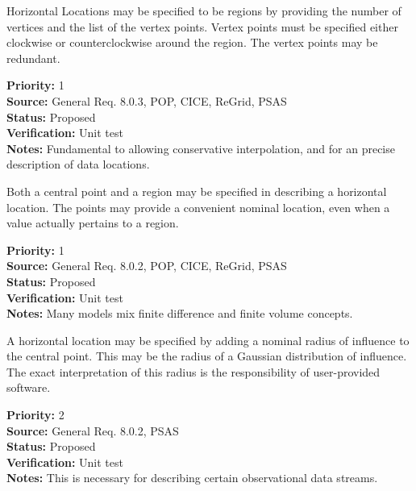 
  Horizontal Locations may be specified to be regions by providing the number
of vertices and the list of the vertex points.  Vertex points must be specified
either clockwise or counterclockwise around the region.  The vertex points
may be redundant.
\begin{reqlist}
{\bf Priority:} 1 \\
{\bf Source:} General Req. 8.0.3, POP, CICE, ReGrid, 
              PSAS \\
{\bf Status:} Proposed \\
{\bf Verification:} Unit test\\
{\bf Notes:} Fundamental to allowing conservative interpolation, and for an
precise description of data locations.
\end{reqlist}
 

  Both a central point and a region may be specified in describing a horizontal
location.  The points may provide a convenient nominal location, even when
a value actually pertains to a region.
\begin{reqlist}
{\bf Priority:} 1 \\
{\bf Source:} General Req. 8.0.2, POP, CICE, ReGrid, 
              PSAS \\
{\bf Status:} Proposed \\
{\bf Verification:} Unit test\\
{\bf Notes:} Many models mix finite difference and finite volume concepts.
\end{reqlist}


  A horizontal location may be specified by adding a nominal radius of
influence to the central point.  This may be the radius of a Gaussian
distribution of influence. The exact interpretation of this radius is
the responsibility of user-provided software.
\begin{reqlist}
{\bf Priority:} 2 \\
{\bf Source:} General Req. 8.0.2, 
              PSAS \\
{\bf Status:} Proposed \\
{\bf Verification:} Unit test\\
{\bf Notes:} This is necessary for describing certain observational data streams.
\end{reqlist}


